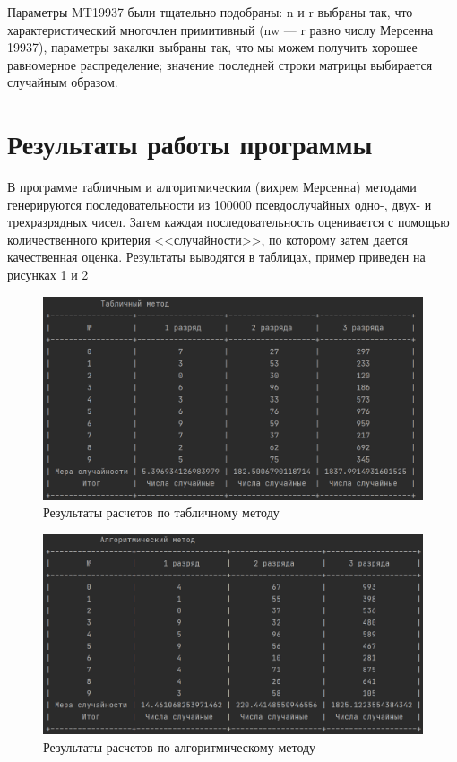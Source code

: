 \documentclass[14pt, a4paper]{extarticle}
\begin{document}
Параметры MT19937 были тщательно подобраны: n и r выбраны так, что характеристический многочлен примитивный (nw — r равно числу Мерсенна 19937), параметры закалки выбраны так, что мы можем получить хорошее равномерное распределение; значение последней строки матрицы выбирается случайным образом.




\section{Результаты работы программы}

В программе табличным и алгоритмическим (вихрем Мерсенна) методами генерируются последовательности из 100000 псевдослучайных одно-, двух- и трехразрядных чисел. Затем каждая последовательность оценивается с помощью количественного критерия <<случайности>>, по которому затем дается качественная оценка. Результаты выводятся в таблицах, пример приведен на рисунках \ref{pic:1} и \ref{pic:2}


\newpage
\begin{figure}[h]
	\begin{center}
		{\includegraphics[scale=0.45]{pictures/res_table.png}
			\caption{Результаты расчетов по табличному методу}
			\label{pic:1}}
	\end{center}
\end{figure}

\begin{figure}[h]
	\begin{center}
		{\includegraphics[scale=0.45]{pictures/res_alg.png}
			\caption{Результаты расчетов по алгоритмическому методу}
			\label{pic:2}}
	\end{center}
\end{figure}
\end{document}
